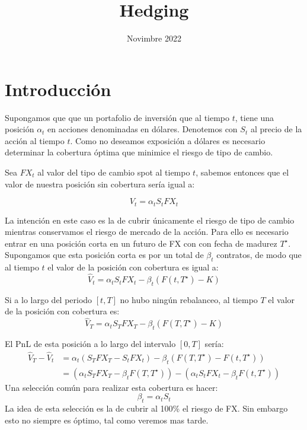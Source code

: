 \documentclass[12pt]{article}
\title{Hedging}
\date{Novimbre 2022}
\begin{document}
\maketitle

\section{Introducción}

Supongamos que que un portafolio de inversión que al tiempo $t$, tiene una  posición  $\alpha_t$ en acciones denominadas en dólares. Denotemos con $S_t$ al precio de la acción al tiempo $t$. Como no deseamos exposición a dólares es necesario determinar la cobertura óptima que minimice el riesgo de tipo de cambio. 

Sea $FX_t$ al valor del tipo de cambio spot al tiempo $t$, sabemos entonces que el valor de nuestra posición  sin cobertura sería igual a:

\begin{equation}
    V_t = \alpha_tS_tFX_t
    \label{eq:1}
\end{equation}

La intención en este caso es la de cubrir únicamente el riesgo de tipo de cambio mientras conservamos el riesgo de mercado de la acción.  Para ello es necesario entrar en una posición corta en un futuro de FX con con fecha de madurez $T^\star$. Supongamos que esta posición corta es por un total de $\beta_t$ contratos, de modo que al tiempo $t$ el valor de la posición con cobertura es igual a:
\begin{equation}
    \hat{V}_t = \alpha_tS_tFX_t - \beta_t\left(F(t, T^\star) - K\right)
    \label{eq:2}
\end{equation}

Si a lo largo del periodo $[t, T]$ no hubo ningún rebalanceo, al tiempo $T$ el valor de la posición con cobertura es:
\begin{equation}
    \hat{V}_T = \alpha_tS_TFX_T - \beta_t\left(F(T, T^\star) - K\right)
    \label{eq:3}    
\end{equation}

El PnL de esta posición a lo largo del intervalo $[0,T]$ sería:
\begin{equation}
    \begin{split}
        \hat{V}_T - \hat{V}_t  & = \alpha_t\left(S_TFX_T - S_tFX_t\right) - \beta_t\left(F(T, T^\star) - F(t, T^\star)\right)\\
        & = \left(\alpha_tS_TFX_T - \beta_tF(T, T^\star)\right) - \left(\alpha_tS_tFX_t  - \beta_tF(t, T^\star)\right)
    \end{split}
        \label{eq:4}
\end{equation}
Una selección común para realizar esta cobertura es hacer:
\begin{equation}
    \beta_t = \alpha_tS_t
    \label{eq:5}
\end{equation}
La idea de esta selección es la de cubrir al 100\% el riesgo de FX. Sin embargo esto no siempre es óptimo, tal como veremos mas tarde.
\end{document}
